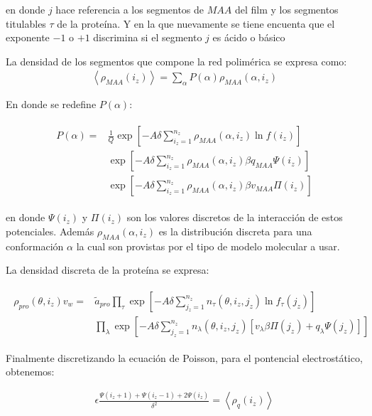 \noindent en donde $j$ hace referencia a los segmentos de $MAA$ del film y los segmentos titulables $\tau$ de la prote\'ina. Y en la que nuevamente se tiene encuenta que el exponente $-1$ o $+1$ discrimina si el segmento $j$ es \'acido o b\'asico


La densidad de los segmentos que compone la red polim\'erica se expresa como:
\begin{align}
	\left< \rho_{MAA}(i_z)\right> = \sum_\alpha P(\alpha)\rho_{MAA}(\alpha, i_z)
\end{align}

En donde se redefine $P(\alpha)$:


\begin{align}
	\begin{aligned}
		P(\alpha) = &\frac{1}{Q}\exp\left[ -A \delta \sum^{n_z}_{i_z = 1} \rho_{MAA}(\alpha, i_z) \ln f(i_z)\right] \\
		&\exp\left[ -A\delta \sum^{n_z}_{i_z = 1}  \rho_{MAA}(\alpha, i_z) \beta q_{MAA} \Psi(i_z)\right] \\
		& \exp\left[ -A\delta \sum^{n_z}_{i_z = 1}  \rho_{MAA}(\alpha, i_z) \beta v_{MAA} \Pi(i_z)\right] 
	\end{aligned}
\end{align}

\noindent en donde $\Psi(i_z)$ y $\Pi(i_z)$ son los valores discretos de la interacci\'on de estos potenciales. Adem\'as $\rho_{MAA}(\alpha, i_z)$ es la distribuci\'on discreta para una conformaci\'on $\alpha$ la cual son provistas por el tipo de modelo molecular a usar.

La densidad discreta de la prote\'ina se expresa:


\begin{align}
	\begin{aligned}
		\rho_{pro}(\theta, i_z)v_w = &\tilde{a}_{pro} \prod_\tau\exp\left[-A \delta \sum^{n_z}_{j_z = 1} n_\tau(\theta,i_z,j_z) \ln f_\tau(j_z)\right] \\
		& \prod_\lambda \exp \left[-A \delta \sum^{n_z}_{j_z = 1}  n_\lambda(\theta,i_z, j_z)[v_\lambda\beta\Pi(j_z) + q_\lambda \Psi(j_z)] \right]
	\end{aligned}
\end{align}

Finalmente discretizando la ecuaci\'on de Poisson, para el pontencial electrost\'atico, obtenemos:

\begin{align}
	\epsilon \frac{\Psi(i_z +1) + \Psi(i_z -1) +2\Psi(i_z)}{\delta^2} = \left< \rho_q(i_z)\right>
	\label{eq:film:discreto-poisson}
\end{align}

